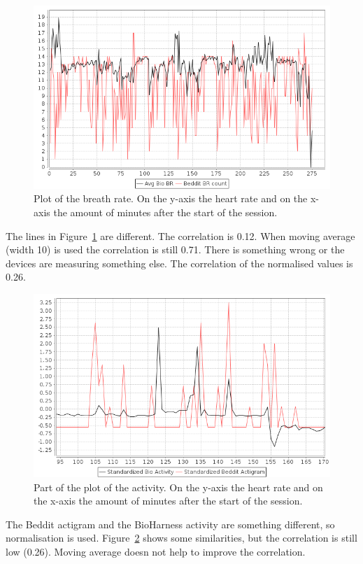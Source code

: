 			\begin{figure}[h]
				\centering
					\includegraphics[scale=0.5]{vsbr.png}
					
				\caption{Plot of the breath rate. On the y-axis the heart rate and on the x-axis the amount of minutes after the start of the session.}
				\label{fig:vsbr}

			\end{figure}

			The lines in Figure~\ref{fig:vsbr} are different. The correlation is 0.12. When moving average (width 10) is used the correlation is still 0.71. There is something wrong or the devices are measuring something else. The correlation of the normalised values is 0.26. 
						
			\begin{figure}[h]
				\centering
					\includegraphics[scale=0.5]{vsactivity.png}
					
				\caption{Part of the plot of the activity. On the y-axis the heart rate and on the x-axis the amount of minutes after the start of the session.}
				\label{fig:vsactivity}

			\end{figure}
			The Beddit actigram and the BioHarness activity are something different, so normalisation is used. Figure~\ref{fig:vsactivity} shows some similarities, but the correlation is still low (0.26). Moving average doesn not help to improve the correlation.

